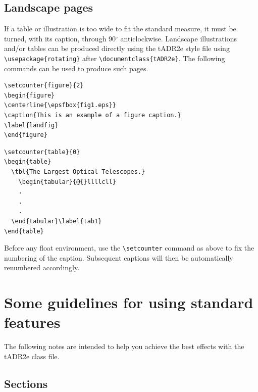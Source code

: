 \documentclass{tADR2e}
\begin{document}
\subsection{Landscape pages}\label{eps}

If a table or illustration is too wide to fit the standard measure, it must be turned, with its caption, through
90$^{\circ}$ anticlockwise. Landscape illustrations and/or tables can be produced directly using the tADR2e style
file using \verb"\usepackage{rotating}" after \verb"\documentclass{tADR2e}". The following commands can be used
to produce such pages.
%
\begin{verbatim}
\setcounter{figure}{2}
\begin{figure}
\centerline{\epsfbox{fig1.eps}}
\caption{This is an example of a figure caption.}
\label{landfig}
\end{figure}
\end{verbatim}
%
\begin{verbatim}
\setcounter{table}{0}
\begin{table}
  \tbl{The Largest Optical Telescopes.}
    \begin{tabular}{@{}llllcll}
    .
    .
    .
  \end{tabular}\label{tab1}
\end{table}
\end{verbatim}
%
Before any float environment, use the \verb"\setcounter" command
as above to fix the numbering of the caption. Subsequent captions
will then be automatically renumbered accordingly.


\section[]{Some guidelines for using standard features}

The following notes are intended to help you achieve the best effects with the tADR2e class file.


\subsection{Sections}
\end{document}
